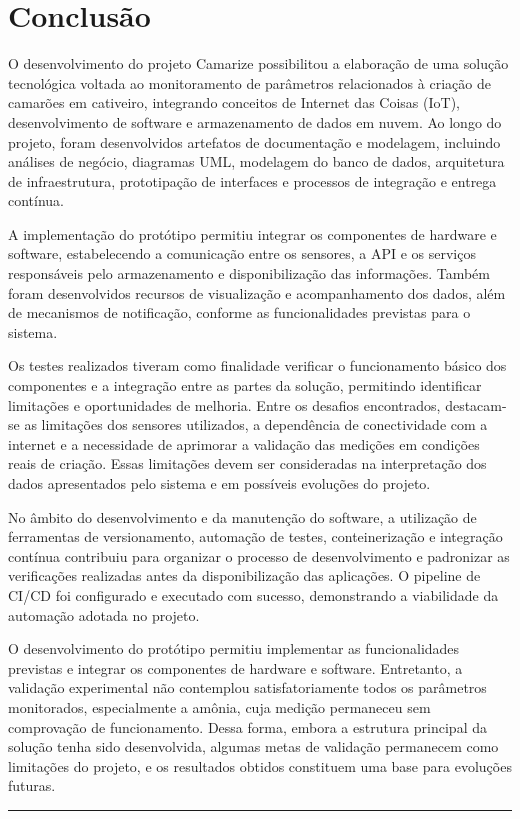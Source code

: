 \documentclass[11pt,a4paper]{article}
\begin{document}
\newpage
\section*{Conclusão}

O desenvolvimento do projeto Camarize possibilitou a elaboração de uma solução tecnológica voltada ao monitoramento de parâmetros relacionados à criação de camarões em cativeiro, integrando conceitos de Internet das Coisas (IoT), desenvolvimento de software e armazenamento de dados em nuvem. Ao longo do projeto, foram desenvolvidos artefatos de documentação e modelagem, incluindo análises de negócio, diagramas UML, modelagem do banco de dados, arquitetura de infraestrutura, prototipação de interfaces e processos de integração e entrega contínua.

A implementação do protótipo permitiu integrar os componentes de hardware e software, estabelecendo a comunicação entre os sensores, a API e os serviços responsáveis pelo armazenamento e disponibilização das informações. Também foram desenvolvidos recursos de visualização e acompanhamento dos dados, além de mecanismos de notificação, conforme as funcionalidades previstas para o sistema.

Os testes realizados tiveram como finalidade verificar o funcionamento básico dos componentes e a integração entre as partes da solução, permitindo identificar limitações e oportunidades de melhoria. Entre os desafios encontrados, destacam-se as limitações dos sensores utilizados, a dependência de conectividade com a internet e a necessidade de aprimorar a validação das medições em condições reais de criação. Essas limitações devem ser consideradas na interpretação dos dados apresentados pelo sistema e em possíveis evoluções do projeto.

No âmbito do desenvolvimento e da manutenção do software, a utilização de ferramentas de versionamento, automação de testes, conteinerização e integração contínua contribuiu para organizar o processo de desenvolvimento e padronizar as verificações realizadas antes da disponibilização das aplicações. O pipeline de CI/CD foi configurado e executado com sucesso, demonstrando a viabilidade da automação adotada no projeto.

O desenvolvimento do protótipo permitiu implementar as funcionalidades previstas e integrar os componentes de hardware e software. Entretanto, a validação experimental não contemplou satisfatoriamente todos os parâmetros monitorados, especialmente a amônia, cuja medição permaneceu sem comprovação de funcionamento. Dessa forma, embora a estrutura principal da solução tenha sido desenvolvida, algumas metas de validação permanecem como limitações do projeto, e os resultados obtidos constituem uma base para evoluções futuras.

\vspace{1cm}
\noindent\rule{\textwidth}{0.5pt}
\vspace{0.3cm}

\newpage
{}

\end{document}
